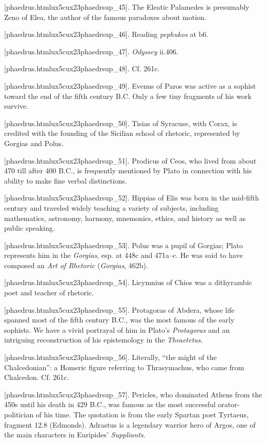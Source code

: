 [phaedrus.htmlux5cux23phaedrsup_45]. The Eleatic Palamedes is
presumably Zeno of Elea, the author of the famous paradoxes about
motion.

[phaedrus.htmlux5cux23phaedrsup_46]. Reading {\em pephukos} at
b6.

[phaedrus.htmlux5cux23phaedrsup_47]. {\em Odyssey} ii.406.

[phaedrus.htmlux5cux23phaedrsup_48]. Cf. 261c.

[phaedrus.htmlux5cux23phaedrsup_49]. Evenus of Paros was active
as a sophist toward the end of the fifth century B.C. Only a few tiny
fragments of his work survive.

[phaedrus.htmlux5cux23phaedrsup_50]. Tisias of Syracuse, with
Corax, is credited with the founding of the Sicilian school of rhetoric,
represented by Gorgias and Polus.

[phaedrus.htmlux5cux23phaedrsup_51]. Prodicus of Ceos, who
lived from about 470 till after 400 B.C., is frequently mentioned by
Plato in connection with his ability to make fine verbal distinctions.

[phaedrus.htmlux5cux23phaedrsup_52]. Hippias of Elis was born
in the mid-fifth century and traveled widely teaching a variety of
subjects, including mathematics, astronomy, harmony, mnemonics, ethics,
and history as well as public speaking.

[phaedrus.htmlux5cux23phaedrsup_53]. Polus was a pupil of
Gorgias; Plato represents him in the {\em Gorgias}, esp. at 448c and
471a--c. He was said to have composed an {\em Art of Rhetoric}
({\em Gorgias}, 462b).

[phaedrus.htmlux5cux23phaedrsup_54]. Licymnius of Chios was a
dithyrambic poet and teacher of rhetoric.

[phaedrus.htmlux5cux23phaedrsup_55]. Protagoras of Abdera,
whose life spanned most of the fifth century B.C., was the most famous
of the early sophists. We have a vivid portrayal of him in Plato's
{\em Protagoras} and an intriguing reconstruction of his epistemology in
the {\em Theaetetus}.

[phaedrus.htmlux5cux23phaedrsup_56]. Literally, “the might of
the Chalcedonian”: a Homeric figure referring to Thrasymachus, who came
from Chalcedon. Cf. 261c.

[phaedrus.htmlux5cux23phaedrsup_57]. Pericles, who dominated
Athens from the 450s until his death in 429 B.C., was famous as the most
successful orator-politician of his time. The quotation is from the
early Spartan poet Tyrtaeus, fragment 12.8 (Edmonds). Adrastus is a
legendary warrior hero of Argos, one of the main characters in
Euripides' {\em Suppliants}.

